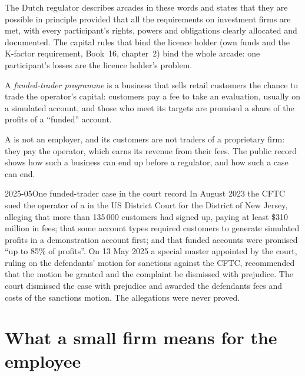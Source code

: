 The Dutch regulator describes arcades in these words and states that they are possible in principle provided that all
the requirements on investment firms are met, with every participant's rights, powers and obligations clearly
allocated and documented. The capital rules that bind the licence holder (own funds and the K-factor requirement, Book~16,
chapter~2) bind the whole arcade: one participant's losses are the licence holder's problem.

\begin{definition}\label{def:in:medium-frequency-proprietary-shops:funded}
A \emph{funded-trader programme} is a business that sells retail customers the chance to
trade the operator's capital: customers pay a fee to take an evaluation, usually on a simulated account, and those who
meet its targets are promised a share of the profits of a ``funded'' account.
\end{definition}

A  is not an employer, and its customers are not traders of a proprietary firm: they pay the
operator, which earns its revenue from their fees. The public record shows how such a business can end up before a
regulator, and how such a case can end.

\begin{dated}{2025-05}{One funded-trader case in the court record}\label{dat:in:medium-frequency-proprietary-shops:mff}
In August 2023 the CFTC sued the operator of a  in the US District Court for the District of New
Jersey, alleging that more than 135\,000 customers had signed up, paying at least \$310 million in fees; that some
account types required customers to generate simulated profits in a demonstration account first; and that funded accounts
were promised ``up to 85\% of profits''. On 13 May 2025 a special master appointed by the court, ruling on the
defendants' motion for sanctions against the CFTC, recommended that the motion be granted and the complaint be dismissed
with prejudice. The court dismissed the case with prejudice and awarded the defendants fees and costs of the sanctions
motion. The allegations were never proved.
\end{dated}

\section{What a small firm means for the employee}

